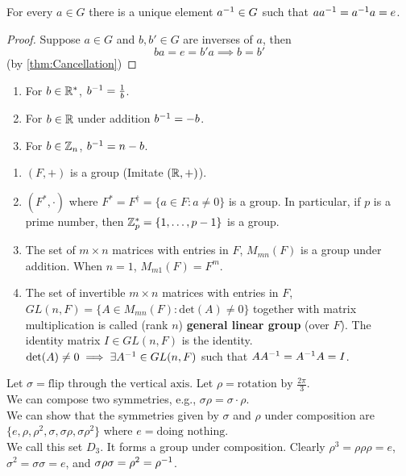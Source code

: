\begin{theorem}
    For every $a \in G$ there is a unique element $a^{-1} \in G$ such that $a a^{-1} = a^{-1} a = e$.
\end{theorem}
\begin{proof}
    Suppose $a \in G$ and $b, b' \in G$ are inverses of $a$, then 
    $$ba = e = b'a \implies b = b'$$ (by \cref{thm:Cancellation})
\end{proof}

\begin{example}
    \spacebeforelist
    \begin{enumerate}
        \item For $b \in \mathbb{R}^*$, $b^{-1} = \frac{1}{b}$.
        \item For $b \in \mathbb{R}$ under addition $b^{-1} = -b$.
        \item For $b \in \mathbb{Z}_n$, $b^{-1} = n - b$.
    \end{enumerate}
\end{example}

\begin{example}
    \spacebeforelist
    \begin{enumerate}
        \item $(F, +)$ is a group (Imitate $(\mathbb{R}, +)$).
        \item $(F^*, \cdot)$ where $F^* = F^\dag = \{a \in F: a \neq 0\}$ is a group. In particular, if $p$ is a prime number, then $\mathbb{Z}_p^* = \{1, \dots, p - 1\}$ is a group.
        \item The set of $m \times n$ matrices with entries in $F$, $M_{mn}(F)$ is a group under addition. When $n=1$, $M_{m1}(F) = F^m$.
        \item The set of invertible $m \times n$ matrices with entries in $F$, $GL(n,F) = \{A \in M_{mn}(F): \mathrm{det}(A) \neq 0\}$ together with matrix multiplication is called (rank $n$) \textbf{general linear group} (over $F$). The identity matrix $I \in GL(n, F)$ is the identity. $\mathrm{det}(A) \neq 0 \implies \exists A^{-1} \in GL(n,F)$ such that $A A^{-1} = A^{-1} A = I$.
    \end{enumerate}
\end{example}

\begin{example}
    Let $\sigma = \text{flip through the vertical axis}$. Let $\rho = \text{rotation by } \frac{2\pi}{3}$. \\
    We can compose two symmetries, e.g., $\sigma\rho = \sigma \cdot \rho$. \\
    We can show that the symmetries given by $\sigma$ and $\rho$ under composition are $\{e, \rho, \rho^2, \sigma, \sigma\rho, \sigma\rho^2\}$ where $e = \text{doing nothing}$. \\
    We call this set $D_3$. It forms a group under composition. Clearly $\rho^3 = \rho\rho\rho = e$, $\sigma^2 = \sigma\sigma = e$, and $\sigma\rho\sigma = \rho^2 = \rho^{-1}$.
\end{example}

